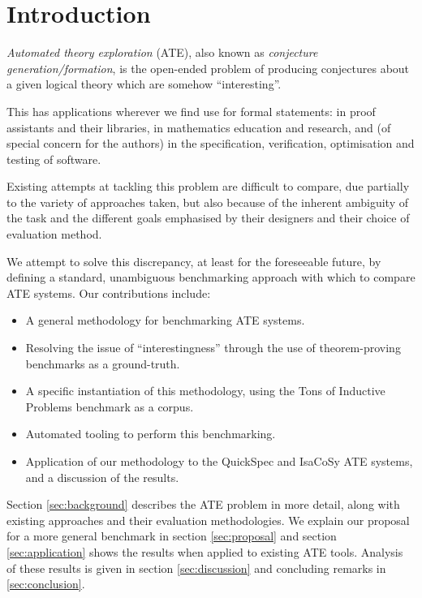 \section{Introduction}
\label{intro}


\emph{Automated theory exploration} (ATE), also known as
\emph{conjecture generation/formation}, is the open-ended problem of producing
conjectures about a given logical theory which are somehow ``interesting''.

This has applications wherever we find use for formal statements: in proof
assistants and their libraries, in mathematics education and research, and
(of special concern for the authors) in the specification, verification,
optimisation and testing of software.

Existing attempts at tackling this problem are difficult to compare, due
partially to the variety of approaches taken, but also because of the inherent
ambiguity of the task and the different goals emphasised by their designers and
their choice of evaluation method.

We attempt to solve this discrepancy, at least for the foreseeable future, by
defining a standard, unambiguous benchmarking approach with which to compare
ATE systems. Our contributions include:

\begin{itemize}
\item A general methodology for benchmarking ATE systems.
\item Resolving the issue of ``interestingness'' through the use of
  theorem-proving benchmarks as a ground-truth.
\item A specific instantiation of this methodology, using the Tons of Inductive
  Problems benchmark as a corpus.
\item Automated tooling to perform this benchmarking.
\item Application of our methodology to the QuickSpec and IsaCoSy ATE systems,
  and a discussion of the results.
\end{itemize}

Section \ref{sec:background} describes the ATE problem in more detail, along
with existing approaches and their evaluation methodologies. We explain our
proposal for a more general benchmark in section \ref{sec:proposal} and
section \ref{sec:application} shows the results when applied to existing ATE tools.
Analysis of these results is given in section \ref{sec:discussion} and
concluding remarks in \ref{sec:conclusion}.

